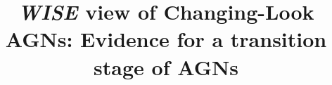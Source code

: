 \documentclass[linenumbers]{aastex631}
\begin{document}
\title{{\it WISE} view of Changing-Look AGNs: Evidence for a transition stage of AGNs}


\end{document}
